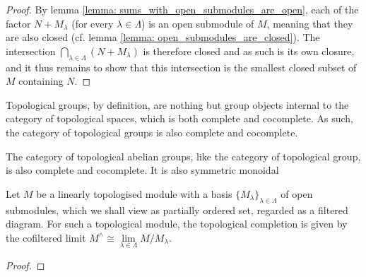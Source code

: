                 \begin{proof}
                    By lemma \ref{lemma: sums_with_open_submodules_are_open}, each of the factor $N + M_{\lambda}$ (for every $\lambda \in \Lambda$) is an open submodule of $M$, meaning that they are also closed (cf. lemma \ref{lemma: open_submodules_are_closed}). The intersection $\bigcap_{\lambda \in \Lambda} (N + M_{\lambda})$ is therefore closed and as such is its own closure, and it thus remains to show that this intersection is the smallest closed subset of $M$ containing $N$. 
                \end{proof}
            
            \begin{remark} \label{remark: (co)limits_of_topological_groups}
                Topological groups, by definition, are nothing but group objects internal to the category of topological spaces, which is both complete and cocomplete. As such, the category of topological groups is also complete and cocomplete. 
            \end{remark}
            \begin{remark} \label{remark: (co)limits_of_topological_rings}
                The category of topological abelian groups, like the category of topological group, is also complete and cocomplete. It is also symmetric monoidal 
            \end{remark}
            \begin{remark} \label{remark: (co)limits_of_topological_modules}
                
            \end{remark}
            \begin{lemma} \label{lemma: adic_completion_as_cofiltered_limits}
                Let $M$ be a linearly topologised module with a basis $\{M_{\lambda}\}_{\lambda \in \Lambda}$ of open submodules, which we shall view as partially ordered set, regarded as a filtered diagram. For such a topological module, the topological completion is given by the cofiltered limit $M^{\wedge} \cong \underset{\lambda \in \Lambda}{\lim} M/M_{\lambda}$.  
            \end{lemma}
                \begin{proof}
                    
                \end{proof}
